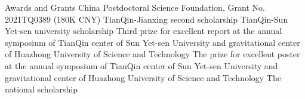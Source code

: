 \begin{rubric}{Awards and Grants}
    \entry*[2021-2023] China Postdoctoral Science Foundation, Grant No. 2021TQ0389 (180K CNY) 
%
    \entry*[2020] TianQin-Jianxing second scholarship
    \entry*[2019] TianQin-Sun Yet-sen university scholarship
    \entry*[2019] Third prize for excellent report at the annual symposium of TianQin center of Sun Yet-sen University and
    gravitational center of Huazhong University of Science and Technology 
    \entry*[2018] The prize for excellent poster at the annual symposium of TianQin center of Sun Yet-sen University and
    gravitational center of Huazhong University of Science and Technology 
    \entry*[2015] The national scholarship
\end{rubric}
